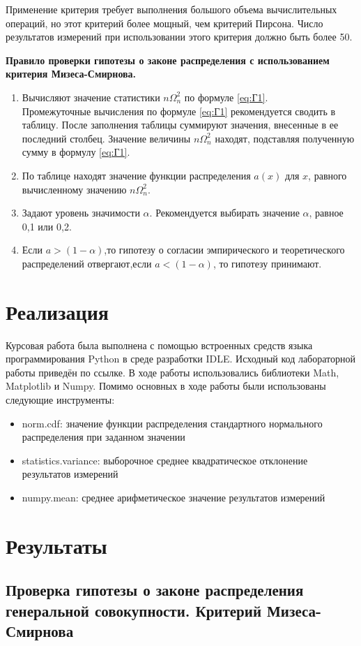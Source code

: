 Применение критерия требует выполнения большого объема вычислительных операций, но этот критерий более мощный, чем критерий Пирсона. Число результатов измерений при использовании этого критерия должно быть более 50.

\textbf{Правило проверки гипотезы о законе распределения с использованием критерия Мизеса-Смирнова.}
\begin{enumerate} 
\item Вычисляют значение статистики $n\Omega_n^2$ по формуле \ref{eq:Г1}. \\
Промежуточные вычисления по формуле \ref{eq:Г1} рекомендуется сводить в таблицу. После заполнения таблицы суммируют значения, внесенные в ее последний столбец. Значение величины $n\Omega_n^2$ находят, подставляя полученную сумму в формулу  \ref{eq:Г1}.
\item По таблице находят значение функции распределения $a(x)$ для $x$, равного вычисленному значению $n\Omega_n^2$.
\item Задают уровень значимости $\alpha$. Рекомендуется выбирать значение $\alpha$, равное 0,1 или 0,2.
\item Если $a>(1-\alpha)$,то гипотезу о согласии эмпирического и теоретического распределений отвергают,если $a<(1-\alpha)$, то гипотезу принимают.
\end{enumerate}
\section{Реализация}
Курсовая работа была выполнена с помощью встроенных средств языка программирования Python в среде разработки IDLE. Исходный код лабораторной работы приведён по ссылке. В ходе работы использовались библиотеки Math, Matplotlib и Numpy.
Помимо основных в ходе работы были использованы следующие инструменты: 
\begin{itemize}
    \item norm.cdf: значение функции распределения стандартного нормального распределения при заданном значении 
    \item statistics.variance: выборочное среднее квадратическое отклонение результатов измерений
    \item numpy.mean: среднее арифметическое значение результатов измерений
\end{itemize}


\section{Результаты}
\subsection{Проверка гипотезы о законе распределения генеральной совокупности. Критерий Мизеса-Смирнова}

